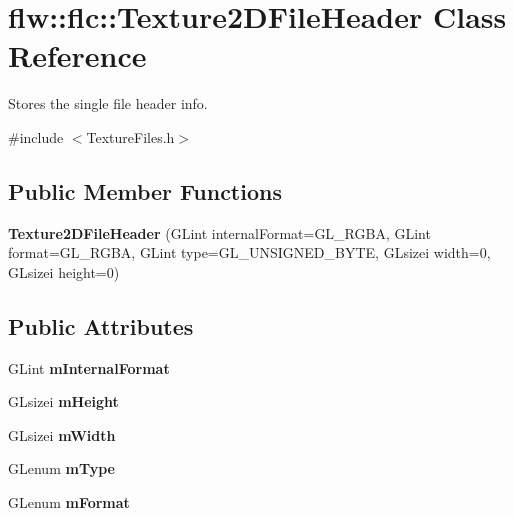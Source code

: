 \hypertarget{classflw_1_1flc_1_1Texture2DFileHeader}{}\section{flw\+:\+:flc\+:\+:Texture2\+D\+File\+Header Class Reference}
\label{classflw_1_1flc_1_1Texture2DFileHeader}


Stores the single file header info.  




{\ttfamily \#include $<$Texture\+Files.\+h$>$}

\subsection*{Public Member Functions}
\begin{DoxyCompactItemize}
\item 
{\bfseries Texture2\+D\+File\+Header} (G\+Lint internal\+Format=G\+L\+\_\+\+R\+G\+BA, G\+Lint format=G\+L\+\_\+\+R\+G\+BA, G\+Lint type=G\+L\+\_\+\+U\+N\+S\+I\+G\+N\+E\+D\+\_\+\+B\+Y\+TE, G\+Lsizei width=0, G\+Lsizei height=0)\hypertarget{classflw_1_1flc_1_1Texture2DFileHeader_a3537761f5ea4357996d4fa714d41431d}{}\label{classflw_1_1flc_1_1Texture2DFileHeader_a3537761f5ea4357996d4fa714d41431d}

\end{DoxyCompactItemize}
\subsection*{Public Attributes}
\begin{DoxyCompactItemize}
\item 
G\+Lint {\bfseries m\+Internal\+Format}\hypertarget{classflw_1_1flc_1_1Texture2DFileHeader_a49d8d1d35da7fa3c214b8a052a76d32c}{}\label{classflw_1_1flc_1_1Texture2DFileHeader_a49d8d1d35da7fa3c214b8a052a76d32c}

\item 
G\+Lsizei {\bfseries m\+Height}\hypertarget{classflw_1_1flc_1_1Texture2DFileHeader_ac5012499cee078672caf0462d796c203}{}\label{classflw_1_1flc_1_1Texture2DFileHeader_ac5012499cee078672caf0462d796c203}

\item 
G\+Lsizei {\bfseries m\+Width}\hypertarget{classflw_1_1flc_1_1Texture2DFileHeader_a7579b301c9555970d9de633d3a230103}{}\label{classflw_1_1flc_1_1Texture2DFileHeader_a7579b301c9555970d9de633d3a230103}

\item 
G\+Lenum {\bfseries m\+Type}\hypertarget{classflw_1_1flc_1_1Texture2DFileHeader_a164b348dfbce34e0ae26fba2dcd37745}{}\label{classflw_1_1flc_1_1Texture2DFileHeader_a164b348dfbce34e0ae26fba2dcd37745}

\item 
G\+Lenum {\bfseries m\+Format}\hypertarget{classflw_1_1flc_1_1Texture2DFileHeader_ae6162c45fbdb378f24d8fdc10e6b691d}{}\label{classflw_1_1flc_1_1Texture2DFileHeader_ae6162c45fbdb378f24d8fdc10e6b691d}

\end{DoxyCompactItemize}


